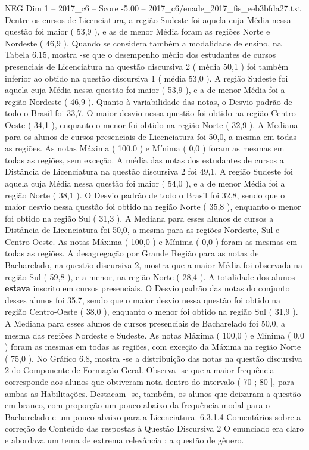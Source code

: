 \begin{textsample}{NEG Dim 1 – 2017\_c6 – Score -5.00 – 2017\_c6/enade\_2017\_fis\_eeb3bfda27.txt}
Dentre os cursos de Licenciatura, a região Sudeste foi aquela cuja Média nessa questão foi maior ( 53,9 ), e as de menor Média foram as regiões Norte e Nordeste ( 46,9 ).
Quando se considera também a modalidade de ensino, na Tabela 6.15, mostra -se que o desempenho médio dos estudantes de cursos presenciais de Licenciatura na questão discursiva 2 ( média 50,1 ) foi também inferior ao obtido na questão discursiva 1 ( média 53,0 ).
A região Sudeste foi aquela cuja Média nessa questão foi maior ( 53,9 ), e a de menor Média foi a região Nordeste ( 46,9 ).
Quanto à variabilidade das notas, o Desvio padrão de todo o Brasil foi 33,7.
O maior desvio nessa questão foi obtido na região Centro-Oeste ( 34,1 ), enquanto o menor foi obtido na região Norte ( 32,9 ).
A Mediana para os alunos de cursos presenciais de Licenciatura foi 50,0, a mesma em todas as regiões.
As notas Máxima ( 100,0 ) e Mínima ( 0,0 ) foram as mesmas em todas as regiões, sem exceção.
A média das notas dos estudantes de cursos a Distância de Licenciatura na questão discursiva 2 foi 49,1.
A região Sudeste foi aquela cuja Média nessa questão foi maior ( 54,0 ), e a de menor Média foi a região Norte ( 38,1 ).
O Desvio padrão de todo o Brasil foi 32,8, sendo que o maior desvio nessa questão foi obtido na região Norte ( 35,8 ), enquanto o menor foi obtido na região Sul ( 31,3 ).
A Mediana para esses alunos de cursos a Distância de Licenciatura foi 50,0, a mesma para as regiões Nordeste, Sul e Centro-Oeste.
As notas Máxima ( 100,0 ) e Mínima ( 0,0 ) foram as mesmas em todas as regiões.
A desagregação por Grande Região para as notas de Bacharelado, na questão discursiva 2, mostra que a maior Média foi observada na região Sul ( 59,8 ), e a menor, na região Norte ( 28,4 ).
A totalidade dos alunos \textbf{estava} inscrito em cursos presenciais.
O Desvio padrão das notas do conjunto desses alunos foi 35,7, sendo que o maior desvio nessa questão foi obtido na região Centro-Oeste ( 38,0 ), enquanto o menor foi obtido na região Sul ( 31,9 ).
A Mediana para esses alunos de cursos presenciais de Bacharelado foi 50,0, a mesma das regiões Nordeste e Sudeste.
As notas Máxima ( 100,0 ) e Mínima ( 0,0 ) foram as mesmas em todas as regiões, com exceção da Máxima na região Norte ( 75,0 ).
No Gráfico 6.8, mostra -se a distribuição das notas na questão discursiva 2 do Componente de Formação Geral.
Observa -se que a maior frequência corresponde aos alunos que obtiveram nota dentro do intervalo ( 70 ; 80 ], para ambas as Habilitações.
Destacam -se, também, os alunos que deixaram a questão em branco, com proporção um pouco abaixo da frequência modal para o Bacharelado e um pouco abaixo para a Licenciatura. 6.3.1.4 Comentários sobre a correção de Conteúdo das respostas à Questão Discursiva 2 O enunciado era claro e abordava um tema de extrema relevância : a questão de gênero.

\end{textsample}

